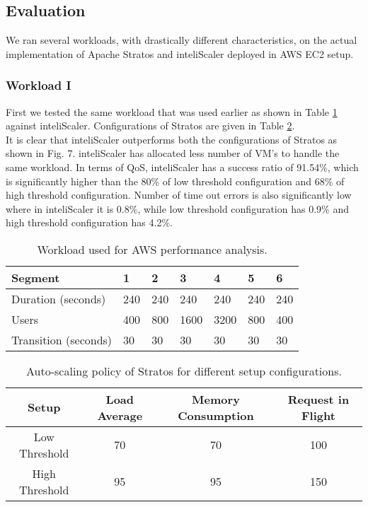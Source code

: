 \subsection{Evaluation}

We ran several workloads, with drastically different characteristics, on the actual implementation of Apache Stratos and inteliScaler deployed in AWS EC2 setup.

\subsubsection{Workload I}
First we tested the same workload that was used earlier as shown in Table \ref{table:analysis_workload} against inteliScaler. Configurations of Stratos are given in Table \ref{table:policy_threshold}.\\

It is clear that inteliScaler outperforms both the configurations of Stratos as shown in Fig. 7. inteliScaler has allocated less number of VM's to handle the same workload. In terms of QoS, inteliScaler has a success ratio of 91.54\%, which is significantly higher than the 80\% of low threshold configuration and 68\% of high threshold configuration. Number of time out errors is also significantly low where in inteliScaler it is 0.8\%, while low threshold configuration has 0.9\% and high threshold configuration has 4.2\%.\\

\begin{table}[h!]
\centering
\caption{Workload used for AWS performance analysis.}
\label{table:analysis_workload}
\begin{tabular}{|l|l|l|l|l|l|l|}
\hline
Segment & 1 & 2 & 3 & 4 & 5 & 6\\ \hline
Duration (seconds) & 240 & 240 & 240 & 240 & 240 & 240 \\ \hline
Users & 400 & 800 & 1600 & 3200 & 800 & 400 \\ \hline
Transition (seconds) & 30 & 30 & 30 & 30 & 30 & 30 \\ \hline
\end{tabular}
\end{table}

\begin{table}[h!]
\centering
\caption{Auto-scaling policy of Stratos for different setup configurations.}
\label{table:policy_threshold}
\begin{tabular}{|c|c|c|c|}
\hline
Setup & Load Average & Memory Consumption & Request in Flight \\ \hline
Low Threshold & 70 & 70 & 100\\ \hline
High Threshold & 95 & 95 & 150\\ \hline
\end{tabular}
\end{table}
